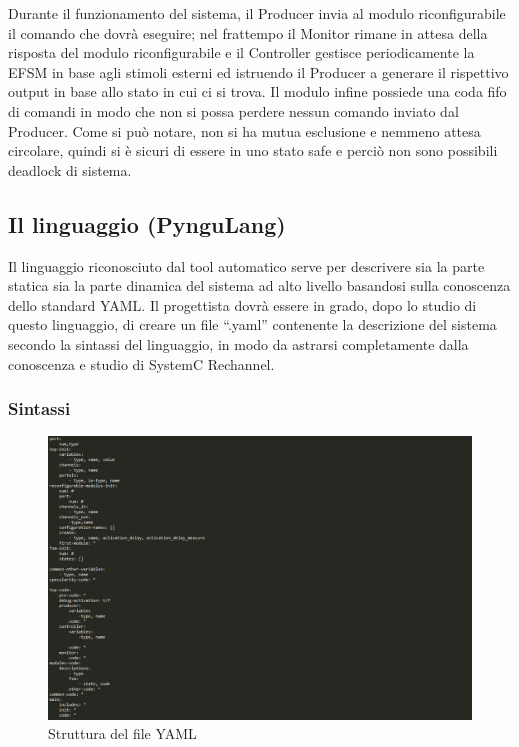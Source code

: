\documentclass[a4paper,titlepage]{book}
\begin{document}
Durante il funzionamento del sistema, il Producer invia al modulo riconfigurabile il comando che dovrà eseguire; nel frattempo il Monitor rimane in attesa della risposta del modulo riconfigurabile e il Controller gestisce periodicamente la EFSM in base agli stimoli esterni ed istruendo il Producer a generare il rispettivo output in base allo stato in cui ci si trova. Il modulo infine possiede una coda fifo di comandi in modo che non si possa perdere nessun comando inviato dal Producer. Come si può notare, non si ha mutua esclusione e nemmeno attesa circolare, quindi si è sicuri di essere in uno stato safe e perciò non sono possibili deadlock di sistema.

\subsection{Il linguaggio (PynguLang)}

Il linguaggio riconosciuto dal tool automatico serve per descrivere sia la parte statica sia la parte dinamica del sistema ad alto livello basandosi sulla conoscenza dello standard YAML. Il progettista dovrà essere in grado, dopo lo studio di questo linguaggio, di creare un file ``.yaml'' contenente la descrizione del sistema secondo la sintassi del linguaggio, in modo da astrarsi completamente dalla conoscenza e studio di SystemC Rechannel.

\subsubsection{Sintassi}

\begin{figure}[!ht]
\centering
\includegraphics[scale=0.45]{strutturayaml.png}
\caption{Struttura del file YAML}\label{fig:yamlfile}
\end{figure}
\end{document}
